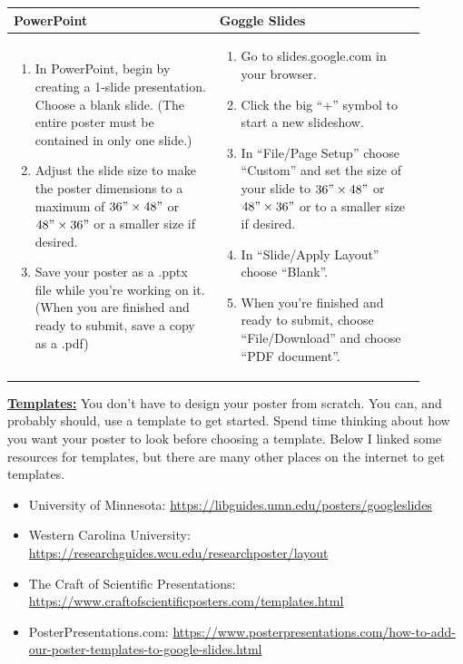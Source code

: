 \documentclass[12pt]{article}
\begin{document}
\begin{table}[h!]
    \centering
    \begin{tabular}{p{0.45\linewidth}p{0.45\linewidth}}\toprule
        \textbf{PowerPoint} & \textbf{Goggle Slides}\\ \midrule
        \begin{enumerate}
            \item In PowerPoint, begin by creating a 1-slide presentation. Choose a blank slide. (The entire poster must be contained in only one slide.)
            \item Adjust the slide size to make the poster dimensions to a maximum of $36"\times48"$ or $48"\times36"$ or a smaller size if desired.
            \item Save your poster as a .pptx file while you're working on it. (When you are finished and ready to submit, save a copy as a .pdf)
        \end{enumerate}&
        \begin{enumerate}
            \item Go to slides.google.com in your browser.
            \item Click the big ``+'' symbol to start a new slideshow.
            \item In ``File/Page Setup'' choose ``Custom'' and set the size of your slide to $36"\times48"$ or $48"\times36"$ or to a smaller size if desired.
            \item In ``Slide/Apply Layout'' choose ``Blank''.
            \item When you're finished and ready to submit, choose ``File/Download'' and choose ``PDF document''.
        \end{enumerate}\\
   \bottomrule
    \end{tabular}
    \end{table}

\underline{\textbf{Templates:}} You don't have to design your poster from scratch. You can, and probably should, use a template to get started. Spend time thinking about how you want your poster to look before choosing a template. Below I linked some resources for templates, but there are many other places on the internet to get templates.
\begin{itemize}
    \item University of Minnesota: \url{https://libguides.umn.edu/posters/googleslides}
    \item Western Carolina University: \url{https://researchguides.wcu.edu/researchposter/layout}
    \item The Craft of Scientific Presentations: \url{https://www.craftofscientificposters.com/templates.html}
    \item PosterPresentations.com: \url{https://www.posterpresentations.com/how-to-add-our-poster-templates-to-google-slides.html}
\end{itemize}
\end{document}

